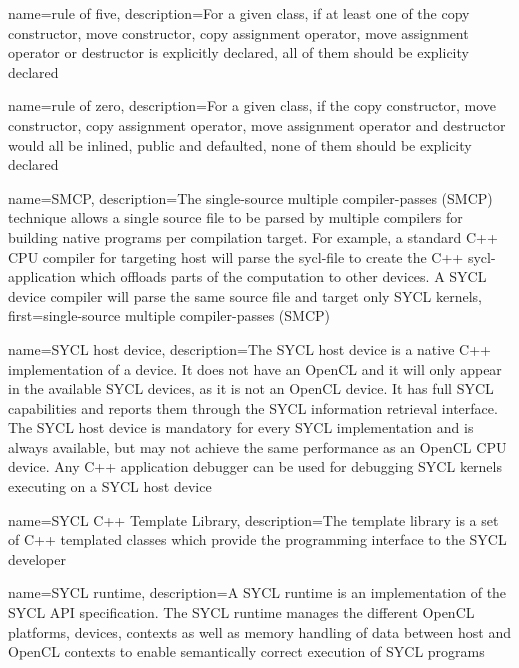 {
  name={rule of five},
  description={For a given class, if at least one of the
  copy constructor, move constructor, copy assignment operator, move assignment operator or destructor
  is explicitly declared,
  all of them should be explicity declared
  }
}

{
  name={rule of zero},
  description={For a given class, if the
  copy constructor, move constructor, copy assignment operator, move assignment operator and destructor
  would all be inlined, public and defaulted,
  none of them should be explicity declared
  }
}

{
  name={SMCP},
  description={The single-source multiple compiler-passes (SMCP) technique allows
         a single source file to be parsed by multiple compilers for
         building native programs per compilation target.
         For example, a standard C++ CPU compiler
               for targeting \gls{host} will parse the  \gls{sycl-file} to create the
               C++ \gls{sycl-application} which offloads parts of the computation to
               other \glspl{device}. A SYCL device compiler will parse the same
               source file and target only SYCL kernels},
  first={single-source multiple compiler-passes (SMCP)}
}

{
  name={SYCL host device},
  description={The SYCL host device is a native C++
               implementation of a \gls{device}. It does not have an OpenCL
                and it will only appear in the 
               available SYCL devices, as it is not an OpenCL device. It has
               full SYCL capabilities and reports them through the SYCL 
               information retrieval interface. The SYCL host device is 
               mandatory for every SYCL implementation and is always available,
               but may not achieve the same performance as an OpenCL CPU device.
               Any C++ application debugger can be used for debugging SYCL
               kernels executing on a SYCL host device}
}

{
  name={SYCL C++ Template Library},
  description={The template library is a set of C++ templated classes which provide
               the programming interface to the SYCL developer}
}

{
  name={SYCL runtime},
  description={A SYCL runtime is an implementation of the SYCL API
               specification. The SYCL runtime manages the different OpenCL
               platforms, \glspl{device}, contexts as well as memory handling of data
               between host and OpenCL contexts to enable semantically
               correct execution of SYCL programs}
}

